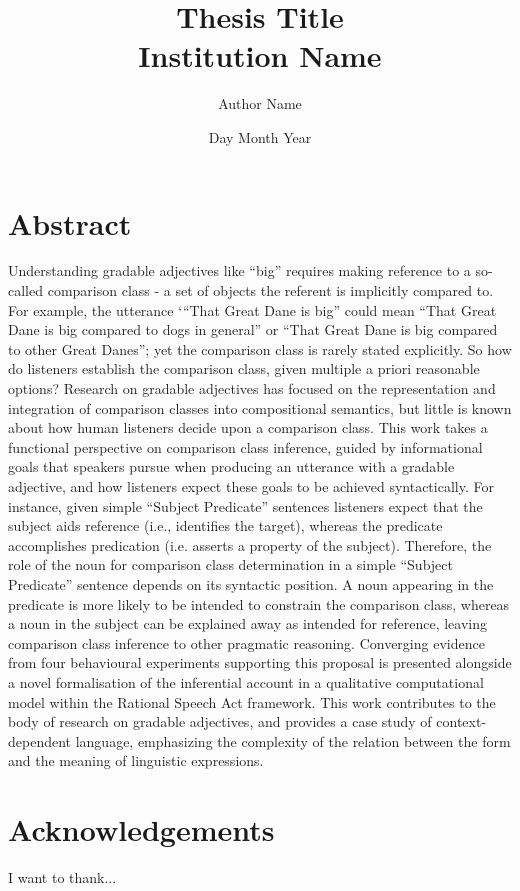\documentclass[11pt, twoside]{report}
\title{
	{Thesis Title}\\
	{\large Institution Name}\\
}
\author{Author Name}
\date{Day Month Year}
\begin{document}
\maketitle

\chapter*{Abstract}
Understanding gradable adjectives like “big” requires making reference to a so-called comparison class - a set of objects the referent is implicitly compared to. For example, the utterance ‘“That Great Dane is big” could mean “That Great Dane is big compared to dogs in general” or “That Great Dane is big compared to other Great Danes”; yet the comparison class is rarely stated explicitly. So how do listeners establish the comparison class, given multiple a priori reasonable options?
Research on gradable adjectives has focused on the representation and integration of comparison classes into compositional semantics, but little is known about how human listeners decide upon a comparison class. 
This work takes a functional perspective on comparison class inference, guided by informational goals that speakers pursue when producing an utterance with a gradable adjective, and how listeners expect these goals to be achieved syntactically. For instance, given simple “Subject Predicate” sentences listeners expect that the subject aids reference (i.e., identifies the target), whereas the predicate accomplishes predication (i.e. asserts a property of the subject). Therefore, the role of the noun for comparison class determination  in a simple “Subject Predicate” sentence depends on its syntactic position. A noun appearing in the predicate is more likely to be intended to constrain the comparison class, whereas a noun in the subject can be explained away as intended for reference, leaving comparison class inference to other pragmatic reasoning. 
Converging evidence from four behavioural experiments supporting this proposal is presented alongside a novel formalisation of the inferential account in a qualitative computational model within the Rational Speech Act framework. This work contributes to the body of research on gradable adjectives, and provides a case study of  context-dependent language, emphasizing the complexity of the relation between the form and the meaning of linguistic expressions. 


\chapter*{Acknowledgements}
I want to thank...
\end{document}
